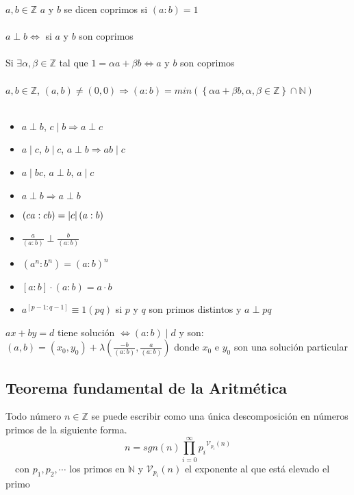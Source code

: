 \documentclass[a4paper,10pt]{article}
\begin{document}
 $a,b \in \mathbb{Z}$ $a$ y $b$ se dicen coprimos si $(a:b) = 1$ \\ \\
\notacion $a \perp b \Leftrightarrow $ si $a$ y $b$ son coprimos \\ \\ 
\propiedad Si $\exists \alpha, \beta \in \mathbb{Z}$ tal que $ 1 = \alpha a + \beta b \Leftrightarrow a$ y $b$ son coprimos \\ \\
\propiedad $a,b \in \mathbb{Z}$, $(a,b) \neq (0,0) \Rightarrow (a:b) = min(\left\lbrace \alpha a + \beta b, \alpha,\beta \in \mathbb{Z} \right\rbrace \cap \mathbb{N} )$ \\ \\
\propiedades
\begin{itemize}
	\item $a \perp b$, $c \mid b \Rightarrow a \perp c$
	\item $a \mid c$, $b \mid c$, $a \perp b \Rightarrow ab \mid c$
	\item $a \mid bc $, $a \perp b$, $a \mid c$
	\item $a \perp b \Rightarrow a \perp b$
	\item $(ca:cb) = \left\lvert c\right\rvert (a:b)$
	\item $\frac{a}{(a:b)} \perp \frac{b}{(a:b)}$
	\item $(a^{n} : b^{n}) = {(a : b)}^{n}$
	\item $[a:b] \cdot (a:b) = a \cdot b$
	\item $a^{[p-1:q-1]} \equiv 1 (pq)$ si $p$ y $q$ son primos distintos y $a \perp pq$
\end{itemize}

\teorema $ax+by=d$ tiene solución $\Leftrightarrow (a:b) \mid d$ y son: $(a,b) = (x_0,y_0) + \lambda (\frac{-b}{(a:b)}, \frac{a}{(a:b)})$ donde $x_0$ e $y_0$ son una solución particular



\subsection{Teorema fundamental de la Aritmética}


\teorema Todo número $n \in \mathbb{Z}$ se puede escribir como una única descomposición  en números primos de la siguiente forma.
$$n = sgn(n) \prod_{i=0}^{\infty} {{p_{i}}^{\mathcal{V}_{p_i}(n)}}$$ \ \ con $p_1,p_2,\cdots$ los primos en $\mathbb{N}$ y $\mathcal{V}_{p_i} (n)$ el exponente al que está elevado el primo \\ \\
\end{document}
